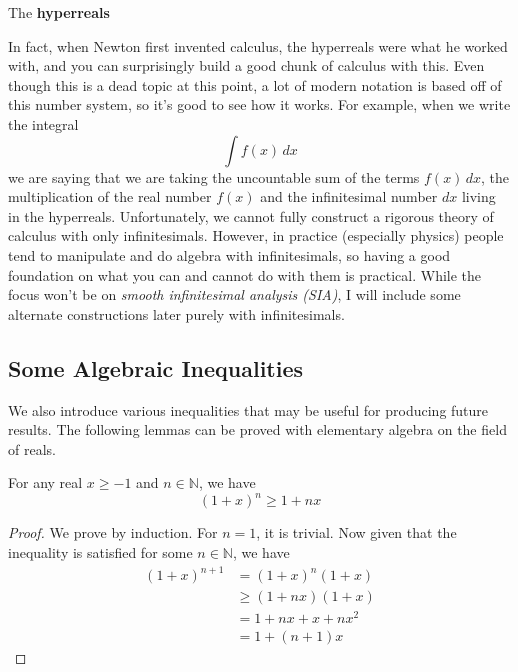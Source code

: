   \begin{theorem}[Hyperreals]
    The \textbf{hyperreals} 
  \end{theorem}

  In fact, when Newton first invented calculus, the hyperreals were what he worked with, and you can surprisingly build a good chunk of calculus with this. Even though this is a dead topic at this point, a lot of modern notation is based off of this number system, so it's good to see how it works. For example, when we write the integral 
  \begin{equation}
    \int f(x) \,dx
  \end{equation} 
  we are saying that we are taking the uncountable sum of the terms $f(x) \,dx$, the multiplication of the real number $f(x)$ and the infinitesimal number $dx$ living in the hyperreals. Unfortunately, we cannot fully construct a rigorous theory of calculus with only infinitesimals. However, in practice (especially physics) people tend to manipulate and do algebra with infinitesimals, so having a good foundation on what you can and cannot do with them is practical. While the focus won't be on \textit{smooth infinitesimal analysis (SIA)}, I will include some alternate constructions later purely with infinitesimals. 

\subsection{Some Algebraic Inequalities}

  We also introduce various inequalities that may be useful for producing future results. The following lemmas can be proved with elementary algebra on the field of reals. 

  \begin{lemma}
    \label{thm:bernoullis-inequality}
    For any real $x \geq -1$ and $n \in \mathbb{N}$, we have 
    \begin{equation}
      (1 + x)^n \geq 1 + nx
    \end{equation}
  \end{lemma}
  \begin{proof}
    We prove by induction. For $n = 1$, it is trivial. Now given that the inequality is satisfied for some $n \in \mathbb{N}$, we have 
    \begin{align}
      (1 + x)^{n + 1} & = (1 + x)^n (1 + x) \\ 
                      & \geq (1 + nx) (1 + x) \\ 
                      & = 1 + nx + x + nx^2 \\ 
                      & = 1 + (n+1)x
    \end{align}
  \end{proof}

